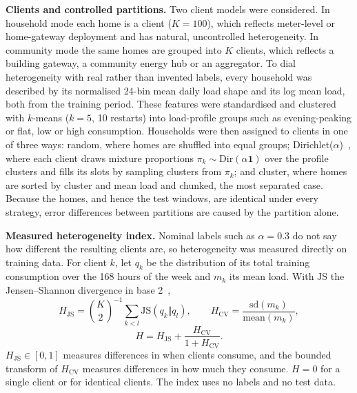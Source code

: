 \textbf{Clients and controlled partitions.} Two client models were considered. In household mode each home is a client
($K=100$), which reflects meter-level or home-gateway deployment and has natural, uncontrolled heterogeneity. In
community mode the same homes are grouped into $K$ clients, which reflects a building gateway, a community energy hub
or an aggregator. To dial heterogeneity with real rather than invented labels, every household was described by its
normalised 24-bin mean daily load shape and its log mean load, both from the training period. These features were
standardised and clustered with $k$-means ($k=5$, 10 restarts) into load-profile groups such as evening-peaking or
flat, low or high consumption. Households were then assigned to clients in one of three ways: random, where homes are
shuffled into equal groups; Dirichlet($\alpha$)~\cite{hsu2019dirichlet}, where each client draws mixture proportions
$\pi_k\sim\mathrm{Dir}(\alpha\mathbf{1})$ over the profile clusters and fills its slots by sampling clusters from
$\pi_k$; and cluster, where homes are sorted by cluster and mean load and chunked, the most separated case. Because
the homes, and hence the test windows, are identical under every strategy, error differences between partitions are
caused by the partition alone.

\textbf{Measured heterogeneity index.} Nominal labels such as $\alpha=0.3$ do not say how different the resulting
clients are, so heterogeneity was measured directly on training data. For client $k$, let $q_k$ be the distribution
of its total training consumption over the 168 hours of the week and $m_k$ its mean load. With $\mathrm{JS}$ the
Jensen--Shannon divergence in base 2~\cite{lin1991divergence},
\begin{equation}\label{eq:hjs}
H_{\mathrm{JS}}={\binom{K}{2}}^{-1}\sum_{k<l}\mathrm{JS}\left(q_k\Vert q_l\right),\qquad H_{\mathrm{CV}}=\frac{\mathrm{sd}(m_k)}{\mathrm{mean}(m_k)},
\end{equation}
\begin{equation}\label{eq:h}
H=H_{\mathrm{JS}}+\frac{H_{\mathrm{CV}}}{1+H_{\mathrm{CV}}}.
\end{equation}
$H_{\mathrm{JS}}\in[0,1]$ measures differences in when clients consume, and the bounded transform of $H_{\mathrm{CV}}$
measures differences in how much they consume. $H=0$ for a single client or for identical clients. The index uses no
labels and no test data.

